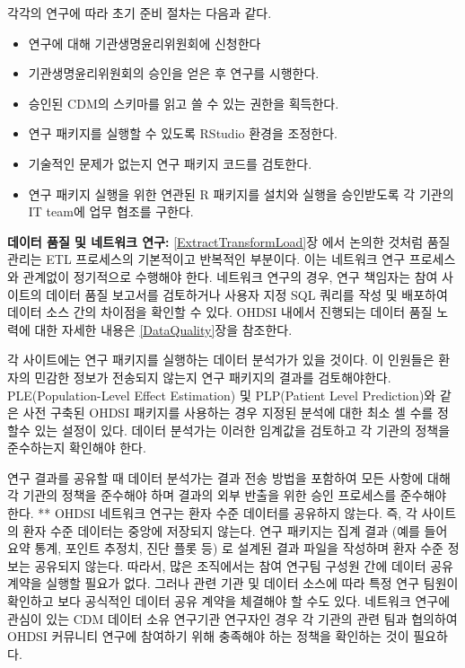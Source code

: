 \documentclass[11pt]{book}
\providecommand{\tightlist}{%
  \setlength{\itemsep}{0pt}\setlength{\parskip}{0pt}}
\theoremstyle{definition}
\theoremstyle{definition}
\theoremstyle{definition}
\theoremstyle{remark}
\let\BeginKnitrBlock\begin \let\EndKnitrBlock\end
\begin{document}
각각의 연구에 따라 초기 준비 절차는 다음과 같다.

\begin{itemize}
\tightlist
\item
  연구에 대해 기관생명윤리위원회에 신청한다
\item
  기관생명윤리위원회의 승인을 얻은 후 연구를 시행한다.
\item
  승인된 CDM의 스키마를 읽고 쓸 수 있는 권한을 획득한다.
\item
  연구 패키지를 실행할 수 있도록 RStudio 환경을 조정한다.
\item
  기술적인 문제가 없는지 연구 패키지 코드를 검토한다.
\item
  연구 패키지 실행을 위한 연관된 R 패키지를 설치와 실행을 승인받도록 각
  기관의 IT team에 업무 협조를 구한다.
\end{itemize}

\BeginKnitrBlock{rmdimportant}
\textbf{데이터 품질 및 네트워크 연구:} \ref{ExtractTransformLoad}장 에서
논의한 것처럼 품질 관리는 ETL 프로세스의 기본적이고 반복적인 부분이다.
이는 네트워크 연구 프로세스와 관계없이 정기적으로 수행해야 한다.
네트워크 연구의 경우, 연구 책임자는 참여 사이트의 데이터 품질 보고서를
검토하거나 사용자 지정 SQL 쿼리를 작성 및 배포하여 데이터 소스 간의
차이점을 확인할 수 있다. OHDSI 내에서 진행되는 데이터 품질 노력에 대한
자세한 내용은 \ref{DataQuality}장을 참조한다.
\EndKnitrBlock{rmdimportant}

각 사이트에는 연구 패키지를 실행하는 데이터 분석가가 있을 것이다. 이
인원들은 환자의 민감한 정보가 전송되지 않는지 연구 패키지의 결과를
검토해야한다. PLE(Population-Level Effect Estimation) 및 PLP(Patient
Level Prediction)와 같은 사전 구축된 OHDSI 패키지를 사용하는 경우 지정된
분석에 대한 최소 셀 수를 정할수 있는 설정이 있다. 데이터 분석가는 이러한
임계값을 검토하고 각 기관의 정책을 준수하는지 확인해야 한다.

연구 결과를 공유할 때 데이터 분석가는 결과 전송 방법을 포함하여 모든
사항에 대해 각 기관의 정책을 준수해야 하며 결과의 외부 반출을 위한 승인
프로세스를 준수해야 한다. ** OHDSI 네트워크 연구는 환자 수준 데이터를
공유하지 않는다. 즉, 각 사이트의 환자 수준 데이터는 중앙에 저장되지
않는다. 연구 패키지는 집계 결과 (예를 들어 요약 통계, 포인트 추정치,
진단 플롯 등) 로 설계된 결과 파일을 작성하며 환자 수준 정보는 공유되지
않는다. 따라서, 많은 조직에서는 참여 연구팀 구성원 간에 데이터 공유
계약을 실행할 필요가 없다. 그러나 관련 기관 및 데이터 소스에 따라 특정
연구 팀원이 확인하고 보다 공식적인 데이터 공유 계약을 체결해야 할 수도
있다. 네트워크 연구에 관심이 있는 CDM 데이터 소유 연구기관 연구자인 경우
각 기관의 관련 팀과 협의하여 OHDSI 커뮤니티 연구에 참여하기 위해
충족해야 하는 정책을 확인하는 것이 필요하다.
\end{document}
